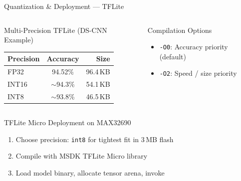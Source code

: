 \documentclass[aspectratio=169,10pt]{beamer}
\begin{document}
\begin{frame}{Quantization \& Deployment — TFLite}
  \begin{columns}[T]
    \begin{block}{Multi-Precision TFLite (DS-CNN Example)}
      \renewcommand{\arraystretch}{1.2}
      \begin{tabular}{@{}lcr@{}}
        \toprule
        Precision & Accuracy & Size \\
        \midrule
        FP32     & \alert{94.52\%} & 96.4\,KB \\
        INT16    & $\sim$94.3\%    & 54.1\,KB \\
        INT8     & $\sim$93.8\%    & \alert{46.5\,KB} \\
        \bottomrule
      \end{tabular}
    \end{block}
    \vspace{4pt}
    \begin{block}{Compilation Options}
      {\small\ttfamily
      \begin{itemize}
        \item \texttt{-O0}: Accuracy priority (default)
        \item \texttt{-O2}: Speed / size priority
      \end{itemize}}
    \end{block}

  \end{columns}

  \vspace{0.2cm}
  \begin{block}{TFLite Micro Deployment on MAX32690}
    {\small
    \begin{enumerate}
      \item Choose precision: \texttt{int8} for tightest fit in 3\,MB flash
      \item Compile with MSDK TFLite Micro library
      \item Load model binary, allocate tensor arena, invoke
    \end{enumerate}}
  \end{block}
\end{frame}
\end{document}

